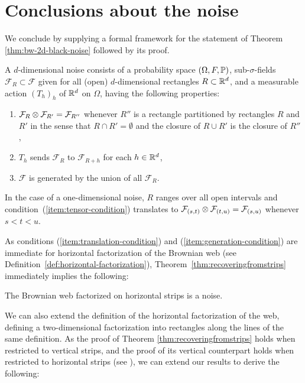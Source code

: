 {
\section{Conclusions about the noise}
\label{sec:conclusions-about-the-noise}

We conclude by supplying a formal framework for the statement of
Theorem \ref{thm:bw-2d-black-noise} followed by its proof.

\newcommand{\F}{\mathcal{F}}
A $d$-dimensional noise consists of a probability space $(\Omega,F, \P)$, sub-$\sigma$-fields $\F_R \subset \F$ given for
all (open) $d$-dimensional rectangles $R \subset \R^d$, and a measurable action $(T_h)_h$ of $\R^d$ on $\Omega$, having the following
properties:
\begin{enumerate}
\item \label{item:tensor-condition} $\F_R \tensor \F_{R'} = \F_{R''}$ whenever $R''$ is a
rectangle partitioned by rectangles $R$ and $R'$ in the sense that
$R\cap R'=\emptyset$ and the closure of $R \cup R'$
is the closure of $R''$,
\item \label{item:translation-condition} $T_h$ sends $\F_R$ to $\F_{R+h}$ for each $h \in \R^d$,
\item \label{item:generation-condition} $\F$ is generated by the union of all $\F_R$.
\end{enumerate}

In the case of a one-dimensional noise, $R$ ranges over all open intervals
and condition~(\ref{item:tensor-condition}) translates to
$\F_{(s,t)} \tensor \F_{(t,u)} = \F_{(s,u)}$ whenever $s < t < u$.

As conditions (\ref{item:translation-condition}) and
(\ref{item:generation-condition}) are immediate for
horizontal factorization of the Brownian web (see
Definition~\ref{def:horizontal-factorization}),
Theorem~\ref{thm:recoveringfromstrips} immediately
implies the following:

\begin{theorem}
The Brownian web factorized on horizontal strips is a noise.
\end{theorem}

We can also extend the definition of the horizontal
factorization of the web, defining a two-dimensional
factorization into rectangles along the lines of the
same definition. As the proof of Theorem \ref{thm:recoveringfromstrips}
holds when restricted to vertical strips, and the proof of its vertical
counterpart holds when restricted to horizontal strips (see ), we can extend our results to derive the following:

}
